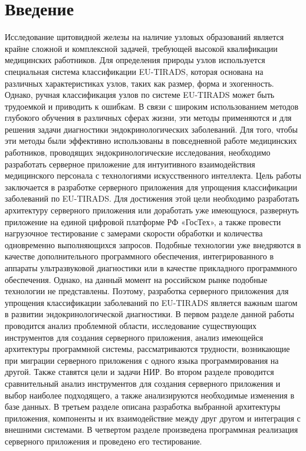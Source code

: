 \chapter*{Введение}
\label{sec:afterwords}

Исследование щитовидной железы на наличие узловых образований является крайне сложной и комплексной задачей, 
требующей высокой квалификации медицинских работников. Для определения природы узлов используется специальная система классификации EU-TIRADS, которая основана на различных характеристиках узлов, таких как размер, форма и эхогенность. Однако, ручная классификация узлов по системе EU-TIRADS может быть трудоемкой и приводить к ошибкам.
В связи с широким использованием методов глубокого обучения в различных сферах жизни, эти методы применяются и для решения задачи диагностики эндокринологических заболеваний. Для того, чтобы эти методы были эффективно использованы в повседневной работе медицинских работников, проводящих эндокринологические исследования, необходимо разработать серверное приложение для интуитивного взаимодействия медицинского персонала с технологиями искусственного интеллекта.
Цель работы заключается в разработке серверного приложения для упрощения классификации заболеваний по EU-TIRADS. Для достижения этой цели необходимо разработать архитектуру серверного приложения или доработать уже имеющуюся, развернуть приложение на единой цифровой платформе РФ «ГосТех», а также провести нагрузочное тестирование с замерами скорости обработки и количества одновременно выполняющихся запросов.
Подобные технологии уже внедряются в качестве дополнительного программного обеспечения, интегрированного в аппараты ультразвуковой диагностики или в качестве прикладного программного обеспечения. Однако, на данный момент на российском рынке подобные технологии не представлены. Поэтому, разработка серверного приложения для упрощения классификации заболеваний по EU-TIRADS является важным шагом в развитии эндокринологической диагностики.
В первом разделе данной работы проводится анализ проблемной области, исследование существующих инструментов для создания серверного приложения, анализ имеющейся архитектуры программной системы, рассматриваются трудности, возникающие при миграции серверного приложения с одного языка программирования на другой. Также ставятся цели и задачи НИР.
Во втором разделе проводится сравнительный анализ инструментов для создания серверного приложения и выбор наиболее подходящего, а также анализируются необходимые изменения в базе данных.
В третьем разделе описана разработка выбранной архитектуры приложения, компоненты и их взаимодействие между друг другом и интеграция с внешними системами.
В четвертом разделе произведена программная реализация серверного приложения и проведено его тестирование.

